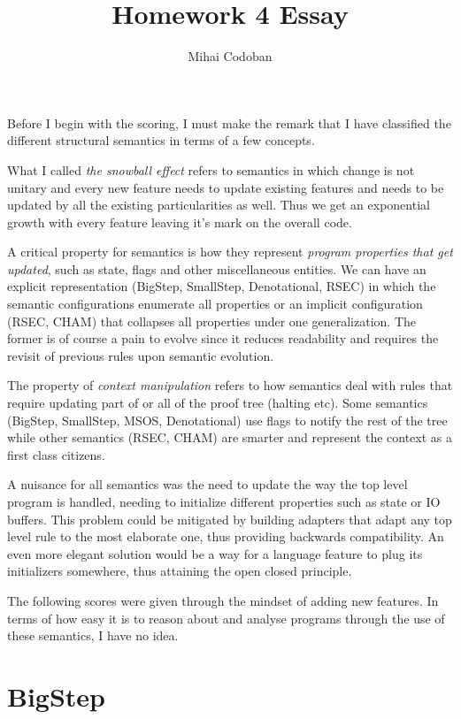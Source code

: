 \documentclass{article}
\title{Homework 4 Essay}
\author{Mihai Codoban}
\date{}
\begin{document}
  \maketitle
Before I begin with the scoring, I must make the remark that I have classified the different structural semantics in terms of a few concepts. 
 
What I called \textit{the snowball effect} refers to semantics in which change is not unitary and every new feature needs to update existing features and needs to be updated by all the existing particularities as well. Thus we get an exponential growth with every feature leaving it's mark on the overall code.
 
A critical property for semantics is how they represent \textit{program properties that get updated}, such as state, flags and other miscellaneous entities. We can have an explicit representation (BigStep, SmallStep, Denotational, RSEC) in which the semantic configurations enumerate all properties or an implicit configuration (RSEC, CHAM) that collapses all properties under one generalization. The former is of course a pain to evolve since it reduces readability and requires the revisit of previous rules upon semantic evolution.	
  
The property of \textit{context manipulation} refers to how semantics deal with rules that require updating part of or all of the proof tree (halting etc). Some semantics (BigStep, SmallStep, MSOS, Denotational) use flags to notify the rest of the tree while other semantics (RSEC, CHAM) are smarter and represent the context as a first class citizens.
 
A nuisance for all semantics was the need to update the way the top level program is handled, needing to initialize different properties such as state or IO buffers. This problem could be mitigated by building adapters that adapt any top level rule to the most elaborate one, thus providing backwards compatibility. An even more elegant solution would be a way for a language feature to plug its initializers somewhere, thus attaining the open closed principle.

The following scores were given through the mindset of adding new features. In terms of how easy it is to reason about and analyse programs through the use of these semantics, I have no idea. 
\section{BigStep}
\end{document}
